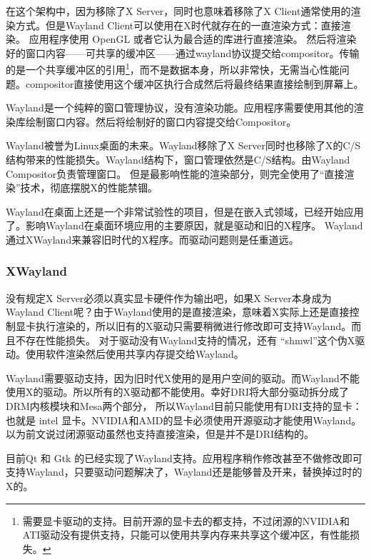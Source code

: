 \documentclass[amstex,twoside]{ctexbook}
\newenvironment{insertnote}{ \ttfamily\CJKfamily{KaiTi} }{\vskip 0.5cm }
\begin{document}
在这个架构中，因为移除了X Server，同时也意味着移除了X Client通常使用的渲染方式。但是Wayland Client可以使用在X时代就存在的一直渲染方式：直接渲染。
应用程序使用 OpenGL 或者它认为最合适的库进行直接渲染。
然后将渲染好的窗口内容——可共享的缓冲区——通过wayland协议提交给compositor。传输的是一个共享缓冲区的引用\footnote{需要显卡驱动的支持。目前开源的显卡去的都支持，不过闭源的NVIDIA和ATI驱动没有提供支持，只能可以使用共享内存来共享这个缓冲区，有性能损失。}，而不是数据本身，所以非常快，无需当心性能问题。compositor直接使用这个缓冲区执行合成然后将最终结果直接绘制到屏幕上。

Wayland是一个纯粹的窗口管理协议，没有渲染功能。应用程序需要使用其他的渲染库绘制窗口内容。然后将绘制好的窗口内容提交给Compositor。

Wayland被誉为Linux桌面的未来。Wayland移除了X Server同时也移除了X的C/S结构带来的性能损失。Wayland结构下，窗口管理依然是C/S结构。由Wayland Compositor负责管理窗口。
但是最影响性能的渲染部分，则完全使用了“直接渲染”技术，彻底摆脱X的性能禁锢。

Wayland在桌面上还是一个非常试验性的项目，但是在嵌入式领域，已经开始应用了。影响Wayland在桌面环境应用的主要原因，就是驱动和旧的X程序。
Wayland通过XWayland来兼容旧时代的X程序。而驱动问题则是任重道远。

\begin{insertnote}
\subsubsection*{XWayland}

没有规定X Server必须以真实显卡硬件作为输出吧，如果X Server本身成为Wayland Client呢？由于Wayland使用的是直接渲染，意味着X实际上还是直接控制显卡执行渲染的，所以旧有的X驱动只需要稍微进行修改即可支持Wayland。而且不存在性能损失。
对于驱动没有Wayland支持的情况，还有 “shmwl”这个伪X驱动。使用软件渲染然后使用共享内存提交给Wayland。

\end{insertnote}

Wayland需要驱动支持，因为旧时代X使用的是用户空间的驱动。而Wayland不能使用X的驱动。所以所有的X驱动都不能使用。幸好DRI将大部分驱动拆分成了DRM内核模块和Mesa两个部分，
所以Wayland目前只能使用有DRI支持的显卡：也就是 intel 显卡。NVIDIA和AMD的显卡必须使用开源驱动才能使用Wayland。以为前文说过闭源驱动虽然也支持直接渲染，但是并不是DRI结构的。

目前Qt 和 Gtk 的已经实现了Wayland支持。应用程序稍作修改甚至不做修改即可支持Wayland，只要驱动问题解决了，Wayland还是能够普及开来，替换掉过时的X的。
\end{document}
